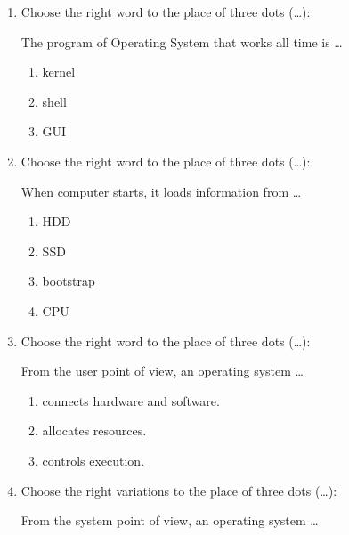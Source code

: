 \documentclass[paper=8.2in:11.6in]{scrartcl}
\begin{document}

\begin{enumerate}

\item Choose the right word to the place of three dots (\ldots):

The program of Operating System that works all time is \ldots

\begin{enumerate}[label=\alph*)]

\item kernel
\item shell
\item GUI

\end{enumerate}

\item Choose the right word to the place of three dots (\ldots):

When computer starts, it loads information from \ldots

\begin{enumerate}[label=\alph*)]

\item HDD
\item SSD
\item bootstrap
\item CPU

\end{enumerate}

\item Choose the right word to the place of three dots (\ldots):

From the user point of view, an operating system \ldots

\begin{enumerate}[label=\alph*)]

\item connects hardware and software.
\item allocates resources.
\item controls execution.

\end{enumerate}

\item Choose the right variations to the place of three dots (\ldots):

From the system point of view, an operating system \ldots

\begin{enumerate}[label=\Roman*.]


\end{enumerate}
\end{enumerate}
\end{document}
